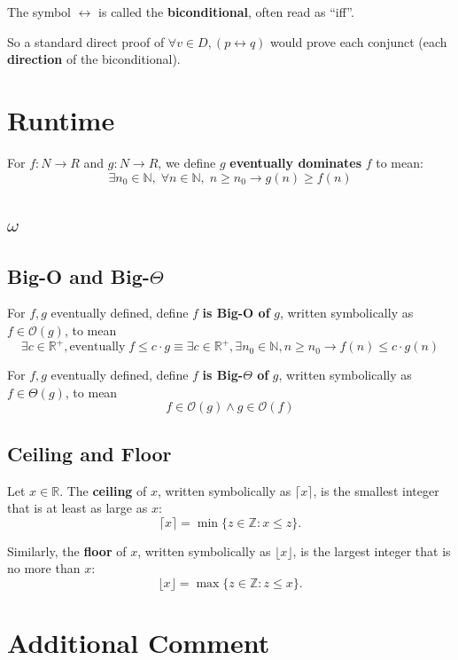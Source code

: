 \documentclass{article}
\begin{document}
The symbol $\leftrightarrow$ is called the \textbf{biconditional}, often read as “iff”.

So a standard direct proof of $\forall v \in D, (p \leftrightarrow q)$ would prove each conjunct (each \textbf{direction} of the biconditional).


\newpage
\section{Runtime}

For $f:N \rightarrow R$ and $g:N \rightarrow R$, we define $g$ \textbf{eventually dominates} $f$ to mean:
\[
\exists n_0\in\mathbb{N},\; \forall n\in \mathbb{N}, \; n\geq n_0\rightarrow g(n)\geq f(n)
\]

\subsection{$\omega$}


\subsection{Big-O and Big-$\Theta$}

For $f,g$ eventually defined, define $f$ \textbf{is Big-O of} $g$, written symbolically as $f\in\mathcal{O}(g)$, to mean
\[
\exists c\in\mathbb{R}^+,\text{eventually}\; f\leq c\cdot g\equiv\exists c\in\mathbb{R}^+,\exists n_0\in \mathbb{N}, n\geq n_0\rightarrow f(n)\leq c\cdot g(n)
\]

For $f,g$ eventually defined, define $f$ \textbf{is Big-$\Theta$ of} $g$, written symbolically as $f\in\mathcal{\Theta}(g)$, to mean
\[
f\in\mathcal{O}(g) \wedge g\in\mathcal{O}(f)
\]

\subsection{Ceiling and Floor}

Let $x \in \mathbb{R}$. The \textbf{ceiling} of $x$, written symbolically as $\lceil x \rceil$, is the smallest integer that is at least as large as $x$:
\[
\lceil x \rceil = \min\{ z \in \mathbb{Z} : x \le z \}.
\]

Similarly, the \textbf{floor} of $x$, written symbolically as $\lfloor x \rfloor$, is the largest integer that is no more than $x$:
\[
\lfloor x \rfloor = \max\{ z \in \mathbb{Z} : z \le x \}.
\]

\newpage
\section{Additional Comment}
\end{document}
